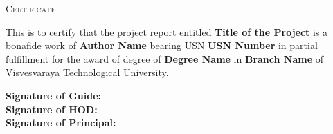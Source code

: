 \documentclass{article}
\begin{document}
\begin{titlepage}
    \centering
    {\scshape\LARGE Certificate\par}
    \vspace{1cm}
    This is to certify that the project report entitled \textbf{Title of the Project} is a bonafide work of \textbf{Author Name} bearing USN \textbf{USN Number} in partial fulfillment for the award of degree of \textbf{Degree Name} in \textbf{Branch Name} of Visvesvaraya Technological University.
    \vspace{2cm}
    
    \begin{flushleft}
    \textbf{Signature of Guide:} \\
    \vspace{2cm}
    \textbf{Signature of HOD:} \\
    \vspace{2cm}
    \textbf{Signature of Principal:}
    \end{flushleft}
    
\end{titlepage}
\end{document}
